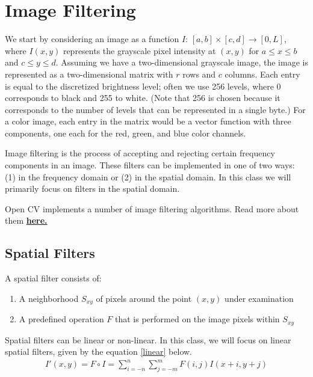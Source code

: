 \documentclass[twoside]{article}
\begin{document}
\section{Image Filtering}
We start by considering an image as a function $I$: $[a,b]\times[c,d] \rightarrow [0,L]$, where $I(x,y)$ represents the grayscale pixel intensity at $(x,y)$ for $a\leq x \leq b$ and $c \leq y \leq d$. Assuming we have a two-dimensional grayscale image, the image is represented as a two-dimensional matrix with $r$ rows and $c$ columns. Each entry is equal to the discretized brightness level; often we use 256 levels, where 0 corresponds to black and 255 to white. (Note that 256 is chosen because it corresponds to the number of levels that can be represented in a single byte.) For a color image, each entry in the matrix would be a vector function with three components, one each for the red, green, and blue color channels.

Image filtering is the process of accepting and rejecting certain frequency components in an image. These filters can be implemented in one of two ways: (1) in the frequency domain or (2) in the spatial domain. In this class we will primarily focus on filters in the spatial domain.

Open CV implements a number of image filtering algorithms. Read more about them \href{https://docs.opencv.org/3.0-beta/modules/imgproc/doc/filtering.html}{\textbf{here.}}

\subsection{Spatial Filters}
A spatial filter consists of:
\begin{enumerate}
  \item A neighborhood $S_{xy}$ of pixels around the point $(x,y)$ under examination
  \item A predefined operation $F$ that is performed on the image pixels within $S_{xy}$
\end{enumerate}

Spatial filters can be linear or non-linear. In this class, we will focus on linear spatial filters, given by the equation \ref{linear} below.
\begin{equation}
  \label{linear}
  \begin{aligned}
    I'(x,y) = F \circ I = \sum_{i=-n}^n \sum_{j=-m}^m F(i,j)I(x+i,y+j)\\
  \end{aligned}
\end{equation}
\end{document}

